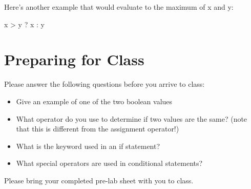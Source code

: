 Here's another example that would evaluate to the maximum of x and y:

\begin{code}

x > y ? x : y

\end{code}

\newpage

\section{Preparing for Class}

Please answer the following questions before you arrive to class:

\begin{exer}

\begin{itemize}
  
\item Give an example of one of the two boolean values

  \evalline

\item What operator do you use to determine if two values are the same? (note that this is different from the assignment operator!)

  \evalline
  
\item What is the keyword used in an if statement? 

  \evalline
  
\item What special operators are used in conditional statements?

  \evalline
  
  
  
\end{itemize}

\end{exer}

Please bring your completed pre-lab sheet with you to class.
